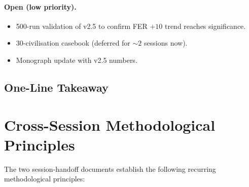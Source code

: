 \paragraph{Open (low priority).}

\begin{itemize}
\item 500-run validation of v2.5 to confirm FER $+10$ trend reaches
significance.
\item 30-civilisation casebook (deferred for $\sim 2$ sessions
now).
\item Monograph update with v2.5 numbers.
\end{itemize}

\subsection{One-Line Takeaway}
\label{sec:methodology-v25-takeaway}


\section{Cross-Session Methodological Principles}
\label{sec:methodology-cross-session}

The two session-handoff documents establish the following recurring
methodological principles:

